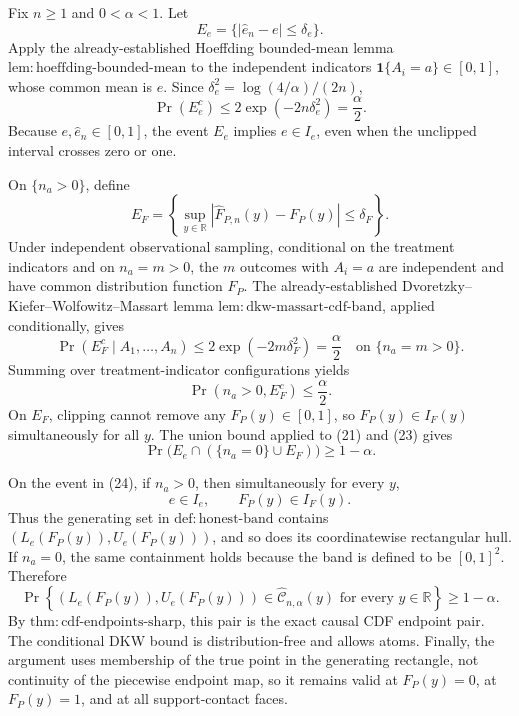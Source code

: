 Fix \(n\ge1\) and \(0<\alpha<1\).  Let
\[
 E_e=\{|\widehat e_n-e|\le\delta_e\}.
\]
Apply the already-established Hoeffding bounded-mean lemma \(\mathrm{lem:hoeffding\text{-}bounded\text{-}mean}\) to the independent indicators \(\mathbf 1\{A_i=a\}\in[0,1]\), whose common mean is \(e\).  Since \(\delta_e^2=\log(4/\alpha)/(2n)\),
\[
 \Pr(E_e^c)\le2\exp(-2n\delta_e^2)=\frac\alpha2. \tag{21}
\]
Because \(e,\widehat e_n\in[0,1]\), the event \(E_e\) implies \(e\in I_e\), even when the unclipped interval crosses zero or one.

On \(\{n_a>0\}\), define
\[
 E_F=\left\{\sup_{y\in\mathbb R}|\widehat F_{P,n}(y)-F_P(y)|\le\delta_F\right\}.
\]
Under independent observational sampling, conditional on the treatment indicators and on \(n_a=m>0\), the \(m\) outcomes with \(A_i=a\) are independent and have common distribution function \(F_P\).  The already-established Dvoretzky--Kiefer--Wolfowitz--Massart lemma \(\mathrm{lem:dkw\text{-}massart\text{-}cdf\text{-}band}\), applied conditionally, gives
\[
 \Pr(E_F^c\mid A_1,\ldots,A_n)
 \le2\exp(-2m\delta_F^2)=\frac\alpha2
 \quad\text{on }\{n_a=m>0\}. \tag{22}
\]
Summing over treatment-indicator configurations yields
\[
 \Pr(n_a>0,E_F^c)\le\frac\alpha2. \tag{23}
\]
On \(E_F\), clipping cannot remove any \(F_P(y)\in[0,1]\), so \(F_P(y)\in I_F(y)\) simultaneously for all \(y\).  The union bound applied to (21) and (23) gives
\[
 \Pr\bigl(E_e\cap(\{n_a=0\}\cup E_F)\bigr)\ge1-\alpha. \tag{24}
\]

On the event in (24), if \(n_a>0\), then simultaneously for every \(y\),
\[
 e\in I_e,\qquad F_P(y)\in I_F(y).
\]
Thus the generating set in \(\mathrm{def:honest\text{-}band}\) contains \((L_e(F_P(y)),U_e(F_P(y)))\), and so does its coordinatewise rectangular hull.  If \(n_a=0\), the same containment holds because the band is defined to be \([0,1]^2\).  Therefore
\[
 \Pr\left\{(L_e(F_P(y)),U_e(F_P(y)))\in
 \widehat{\mathcal C}_{n,\alpha}(y)\text{ for every }y\in\mathbb R\right\}
 \ge1-\alpha.
\]
By \(\mathrm{thm:cdf\text{-}endpoints\text{-}sharp}\), this pair is the exact causal CDF endpoint pair.  The conditional DKW bound is distribution-free and allows atoms.  Finally, the argument uses membership of the true point in the generating rectangle, not continuity of the piecewise endpoint map, so it remains valid at \(F_P(y)=0\), at \(F_P(y)=1\), and at all support-contact faces.
